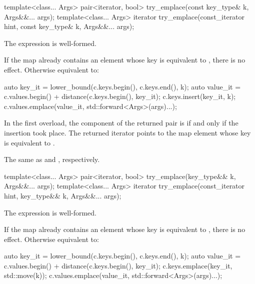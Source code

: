 \begin{codeblock}
\begin{codeblock}
\begin{codeblock}
\begin{addedblock}
%
\begin{itemdecl}
template<class... Args>
  pair<iterator, bool> try_emplace(const key_type& k, Args&&... args);
template<class... Args>
  iterator try_emplace(const_iterator hint, const key_type& k, Args&&... args);
\end{itemdecl}

\begin{itemdescr}
\pnum
\constraints
The expression  is
well-formed.

\pnum
\effects
If the map already contains an element whose key is equivalent to ,
there is no effect.  Otherwise equivalent to:
\begin{codeblock}
auto key_it = lower_bound(c.keys.begin(), c.keys.end(), k);
auto value_it = c.values.begin() + distance(c.keys.begin(), key_it);
c.keys.insert(key_it, k);
c.values.emplace(value_it, std::forward<Args>(args)...);
\end{codeblock}

\pnum
\returns
In the first overload, the  component of the returned pair
is  if and only if the insertion took place.  The returned
iterator points to the map element whose key is equivalent to .

\pnum
\complexity
The same as  and ,
respectively.
\end{itemdescr}

%
\begin{itemdecl}
template<class... Args>
  pair<iterator, bool> try_emplace(key_type&& k, Args&&... args);
template<class... Args>
  iterator try_emplace(const_iterator hint, key_type&& k, Args&&... args);
\end{itemdecl}

\begin{itemdescr}
\pnum
\constraints
The expression  is
well-formed.

\pnum
\effects
If the map already contains an element whose key is equivalent to ,
there is no effect.  Otherwise equivalent to:
\begin{codeblock}
auto key_it = lower_bound(c.keys.begin(), c.keys.end(), k);
auto value_it = c.values.begin() + distance(c.keys.begin(), key_it);
c.keys.emplace(key_it, std::move(k));
c.values.emplace(value_it, std::forward<Args>(args)...);
\end{codeblock}


\end{itemdescr}
\end{addedblock}
\end{codeblock}
\end{codeblock}
\end{codeblock}
